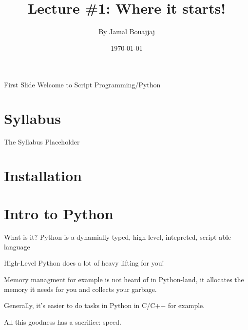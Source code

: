 %
%



\title{Lecture \#1: Where it starts!}
\author{By Jamal Bouajjaj}
\date{\today}



\maketitle

\begin{frame}[standout]{First Slide}
  Welcome to Script Programming/Python
\end{frame}

\section{Syllabus}

\begin{frame}{The Syllabus}
    Placeholder
\end{frame}

\section{Installation}

\section{Intro to Python}
\begin{frame}{What is it?}
    Python is a dynamially-typed, high-level, intepreted, script-able language
\end{frame}

\begin{frame}{High-Level}
    Python does a lot of heavy lifting for you!

    Memory managment for example is not heard of in Python-land, it allocates the memory it needs for you and collects your garbage.

    Generally, it's easier to do tasks in Python in C/C++ for example.

    All this goodness has a sacrifice: speed.
\end{frame}

